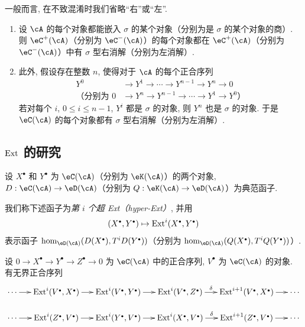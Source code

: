 一般而言, 在不致混淆时我们省略“右”或“左”.

\begin{proposition}\label{VIII:3-1-9}
\begin{enumerate}
  \item 设 $\cA$ 的每个对象都能嵌入 $\sigma$ 的某个对象（分别为是 $\sigma$ 的某个对象的商）. 则 $\eC^+(\cA)$（分别为 $\eC^-(\cA)$）的每个对象都在 $\eC^+(\cA)$（分别为 $\eC^-(\cA)$）中有 $\sigma$ 型右消解（分别为左消解）.
  \item 此外, 假设存在整数 $n$, 使得对于 $\cA$ 的每个正合序列
    \begin{align*}
      Y^0 &\to Y^1 \to \cdots \to Y^{n-1} \to Y^n \to 0 \\
      \text{（分别为 } 0 &\to Y^n \to Y^{n-1} \to \cdots \to Y^1 \to Y^0 \text{）}
    \end{align*}
    若对每个 $i$, $0\leqslant i\leqslant n-1$, $Y^i$ 都是 $\sigma$ 的对象, 则 $Y^n$ 也是 $\sigma$ 的对象. 于是 $\eC(\cA)$ 的每个对象都有 $\sigma$ 型右消解（分别为左消解）.
\end{enumerate}
\end{proposition}

\subsection{$\operatorname{Ext}$ 的研究}\label{VIII:3-2}

设 $X^\bullet$ 和 $Y^\bullet$ 为 $\eC(\cA)$（分别为 $\eK(\cA)$）的两个对象, $D:\eC(\cA) \to \eD(\cA)$（分别为 $Q:\eK(\cA) \to \eD(\cA)$）为典范函子.

\begin{definition}\label{VIII:3-2-1}
我们称下述函子为\emph{第 $i$ 个超 Ext（hyper-Ext）}, 并用
\[
  (X^\bullet,Y^\bullet)\mapsto \ext^i(X^\bullet,Y^\bullet)
\]
表示函子 $\hom_{\eD(\cA)}(D(X^\bullet),T^i D(Y^\bullet))$（分别为 $\hom_{\eD(\cA)}(Q(X^\bullet),T^i Q(Y^\bullet))$）.
\end{definition}

\begin{proposition}\label{VIII:3-2-2}
设 $0 \to X^\bullet \to Y^\bullet \to Z^\bullet \to 0$ 为 $\eC(\cA)$ 中的正合序列, $V^\bullet$ 为 $\eC(\cA)$ 的对象. 有无界正合序列
\[\xymatrix@=0.5cm{
  \cdots \ar[r]
    & \ext^i(V^\bullet,X^\bullet) \ar[r]
    & \ext^i(V^\bullet,Y^\bullet) \ar[r]
    & \ext^i(V^\bullet,Z^\bullet) \ar[r]^-\delta
    & \ext^{i+1}(V^\bullet,X^\bullet) \ar[r]
    & \cdots \\
  \cdots \ar[r]
    & \ext^i(Z^\bullet,V^\bullet) \ar[r]
    & \ext^i(Y^\bullet,V^\bullet) \ar[r]
    & \ext^i(X^\bullet,V^\bullet) \ar[r]^-\delta
    & \ext^{i+1}(Z^\bullet,V^\bullet) \ar[r]
    & \cdots
}\]
\end{proposition}


